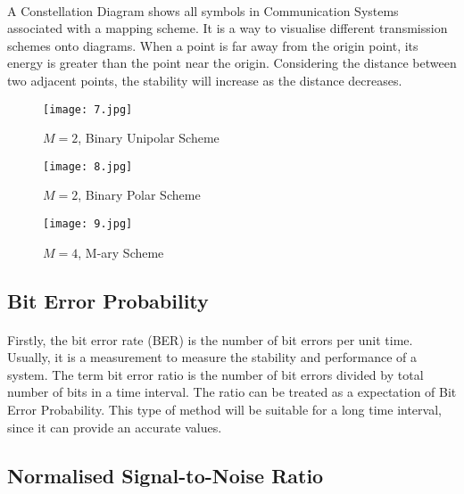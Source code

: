 \documentclass[12pt]{article}
\begin{document}
    \paragraph{}
    A Constellation Diagram shows all symbols in Communication Systems
    associated with a mapping scheme\cite{5}. It is a way to visualise different transmission schemes onto diagrams. When a point is far away from the origin point, its energy is greater than the point near the origin. Considering the distance between two adjacent points, the stability will increase as the distance decreases.
    \begin{figure}[htbp]
    \begin{minipage}[t]{0.3\linewidth}
    \centering
    \texttt{[image: 7.jpg]}
    \caption{$M=2$, Binary Unipolar Scheme}
    \label{fig:side:a}
    \end{minipage}
    \begin{minipage}[t]{0.3\linewidth}
    \centering
    \texttt{[image: 8.jpg]}
    \caption{$M=2$, Binary Polar Scheme}
    \end{minipage}
    \begin{minipage}[t]{0.3\linewidth}
    \centering
    \texttt{[image: 9.jpg]}
    \caption{$M=4$, M-ary Scheme}
    \label{}
    \end{minipage}
    \end{figure}
    
    
    
    
    
    \subsection{Bit Error Probability}
    \paragraph{}
    Firstly, the bit error rate (BER) is the number of bit errors per unit time. Usually, it is a measurement to measure the stability and performance of a system. The term bit error ratio is the number of bit errors divided by total number of bits in a time interval. The ratio can be treated as a expectation of Bit Error Probability\cite{6}. This type of method will be suitable for a long time interval, since it can provide an accurate values. 
    
    
    
    
    \subsection{Normalised Signal-to-Noise Ratio}
\end{document}
